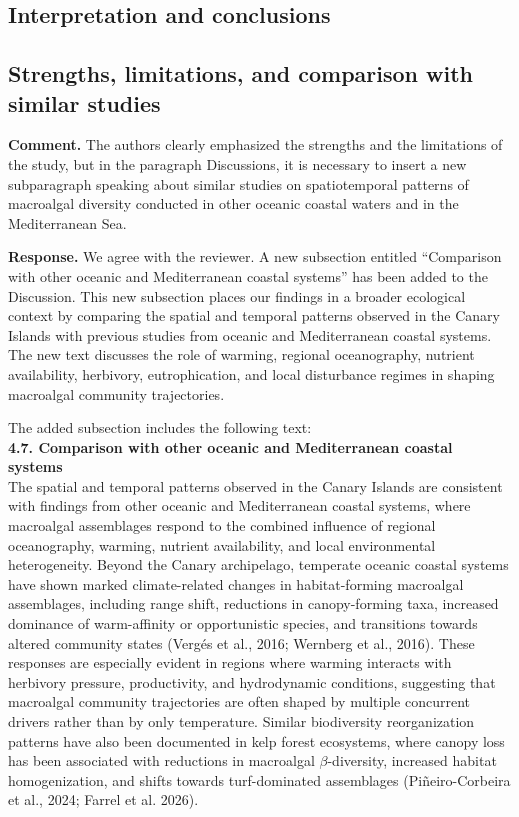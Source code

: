 \documentclass[12pt]{article}
\newcommand{\reviewercomment}[1]{%
\vspace{0.3em}
\noindent\textbf{Comment.} \textcolor{commentblue}{#1}\par
}
\newcommand{\authorresponse}[1]{%
\vspace{0.3em}
\noindent\textbf{Response.} \textcolor{responsegreen}{#1}\par
\vspace{0.8em}
}
\begin{document}
\subsection{Interpretation and conclusions}

\subsection{Strengths, limitations, and comparison with similar studies}

\reviewercomment{The authors clearly emphasized the strengths and the limitations of the study, but in the paragraph Discussions, it is necessary to insert a new subparagraph speaking about similar studies on spatiotemporal patterns of macroalgal diversity conducted in other oceanic coastal waters and in the Mediterranean Sea.}

\authorresponse{We agree with the reviewer. A new subsection entitled ``Comparison with other oceanic and Mediterranean coastal systems'' has been added to the Discussion. This new subsection places our findings in a broader ecological context by comparing the spatial and temporal patterns observed in the Canary Islands with previous studies from oceanic and Mediterranean coastal systems. The new text discusses the role of warming, regional oceanography, nutrient availability, herbivory, eutrophication, and local disturbance regimes in shaping macroalgal community trajectories.}

The added subsection includes the following text: \\

\textbf{ 4.7. Comparison with other oceanic and Mediterranean coastal systems}\\ 
The spatial and temporal patterns observed in the Canary Islands are consistent with findings from other oceanic and Mediterranean coastal systems, where macroalgal assemblages respond to the combined influence of regional oceanography, warming, nutrient availability, and local environmental heterogeneity. Beyond the Canary archipelago, temperate oceanic coastal systems have shown marked climate-related changes in habitat-forming macroalgal assemblages, including range shift, reductions in canopy-forming taxa, increased dominance of warm-affinity or opportunistic species, and transitions towards altered community states (Vergés et al., 2016; Wernberg et al., 2016). These responses are especially evident in regions where warming interacts with herbivory pressure, productivity, and hydrodynamic conditions, suggesting that macroalgal community trajectories are often shaped by multiple concurrent drivers rather than by only temperature. Similar biodiversity reorganization patterns have also been documented in kelp forest ecosystems, where canopy loss has been associated with reductions in macroalgal $\beta$-diversity, increased habitat homogenization, and shifts towards turf-dominated assemblages (Piñeiro-Corbeira et al., 2024; Farrel et al. 2026). 
\end{document}
